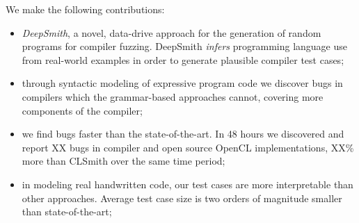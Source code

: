 %
%

We make the following contributions:
%
\begin{itemize}
\item \emph{DeepSmith}, a novel, data-drive approach for the generation of random programs for compiler fuzzing. DeepSmith \emph{infers} programming language use from real-world examples in order to generate plausible compiler test cases; %
\item through syntactic modeling of expressive program code we discover bugs in compilers which the grammar-based approaches cannot, covering more components of the compiler;
\item we find bugs faster than the state-of-the-art. In 48 hours we discovered and report XX bugs in compiler and open source OpenCL implementations, XX\% more than CLSmith over the same time period;
\item in modeling real handwritten code, our test cases are more interpretable than other approaches. Average test case size is two orders of magnitude smaller than state-of-the-art;
\end{itemize}
